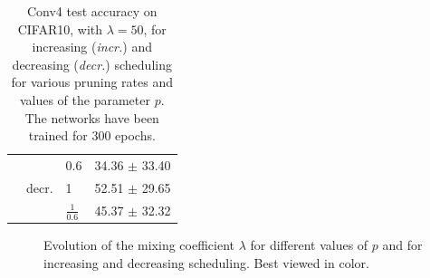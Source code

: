 \begin{table}[htbp]
\begin{tabular}{lllc}
        \cline{2-4}
                                   & \multirow{3}{*}{decr.}   & 0.6             & 34.36 $\pm$ 33.40           \\
                                   &                          & 1               & 52.51 $\pm$ 29.65           \\
                                   &                          & $\frac{1}{0.6}$ & 45.37 $\pm$ 32.32           \\
        \bottomrule
    \end{tabular}
    \caption{Conv4 test accuracy on CIFAR10, with $\lambda=50$, for increasing
        (\emph{incr.}) and decreasing (\emph{decr.}) scheduling for various pruning
        rates and values of the parameter $p$. The networks have been trained for
        300 epochs.}
    \label{sec:appendix:annihiliation_table}
\end{table}


\begin{figure}[!h]
    \centering
    \caption{Evolution of the mixing coefficient $\lambda$ for different values
        of $p$ and for increasing and decreasing scheduling. Best viewed in color.}
    \label{fig:appendix:annihiliation_inc_dec}
\end{figure}

